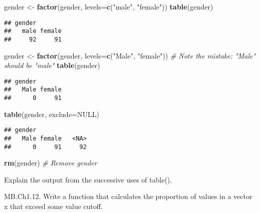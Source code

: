 \documentclass[
]{article}
\newenvironment{Shaded}{\begin{snugshade}}{\end{snugshade}}
\newcommand{\CommentTok}[1]{\textcolor[rgb]{0.56,0.35,0.01}{\textit{#1}}}
\newcommand{\DataTypeTok}[1]{\textcolor[rgb]{0.13,0.29,0.53}{#1}}
\newcommand{\KeywordTok}[1]{\textcolor[rgb]{0.13,0.29,0.53}{\textbf{#1}}}
\newcommand{\NormalTok}[1]{#1}
\newcommand{\OtherTok}[1]{\textcolor[rgb]{0.56,0.35,0.01}{#1}}
\newcommand{\StringTok}[1]{\textcolor[rgb]{0.31,0.60,0.02}{#1}}
\begin{document}
\begin{Shaded}
\begin{Highlighting}[]
\NormalTok{gender <-}\StringTok{ }\KeywordTok{factor}\NormalTok{(gender, }\DataTypeTok{levels=}\KeywordTok{c}\NormalTok{(}\StringTok{"male"}\NormalTok{, }\StringTok{"female"}\NormalTok{))}
\KeywordTok{table}\NormalTok{(gender)}
\end{Highlighting}
\end{Shaded}

\begin{verbatim}
## gender
##   male female 
##     92     91
\end{verbatim}

\begin{Shaded}
\begin{Highlighting}[]
\NormalTok{gender <-}\StringTok{ }\KeywordTok{factor}\NormalTok{(gender, }\DataTypeTok{levels=}\KeywordTok{c}\NormalTok{(}\StringTok{"Male"}\NormalTok{, }\StringTok{"female"}\NormalTok{))}
\CommentTok{# Note the mistake: "Male" should be "male"}
\KeywordTok{table}\NormalTok{(gender)}
\end{Highlighting}
\end{Shaded}

\begin{verbatim}
## gender
##   Male female 
##      0     91
\end{verbatim}

\begin{Shaded}
\begin{Highlighting}[]
\KeywordTok{table}\NormalTok{(gender, }\DataTypeTok{exclude=}\OtherTok{NULL}\NormalTok{)}
\end{Highlighting}
\end{Shaded}

\begin{verbatim}
## gender
##   Male female   <NA> 
##      0     91     92
\end{verbatim}

\begin{Shaded}
\begin{Highlighting}[]
\KeywordTok{rm}\NormalTok{(gender)  }\CommentTok{# Remove gender}
\end{Highlighting}
\end{Shaded}

Explain the output from the successive uses of table().

MB.Ch1.12. Write a function that calculates the proportion of values in
a vector x that exceed some value cutoff.
\end{document}
